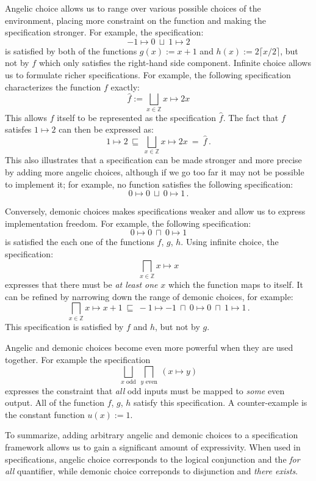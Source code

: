 \documentclass[11pt,oneside,draft]{book}
\theoremstyle{definition}
\newcommand{\refby}{\sqsubseteq} %
\begin{document}
Angelic choice allows us to range over
various possible choices of the environment,
placing more constraint on the function and
making the specification stronger.
For example,
the specification:
\[
    -1 \mapsto 0
    \: \sqcup \:
    1 \mapsto 2
\]
is satisfied by both of the functions
$g(x) := x + 1$ and $h(x) := 2 \lceil x / 2 \rceil$,
but not by $f$ which only satisfies the right-hand side component.
Infinite choice allows us to formulate
richer specifications.
For example, the following specification
characterizes the function $f$ exactly:
\[
  \hat{f} := \bigsqcup_{x \in \mathbb{Z}} x \mapsto 2x
\]
This allows $f$ itself to be represented as the specification $\hat{f}$.
The fact that $f$ satisfes $1 \mapsto 2$ can then be expressed as:
\[
  1 \mapsto 2
  \: \sqsubseteq \:
  \bigsqcup_{x \in \mathbb{Z}} x \mapsto 2x
  \: = \:
  \hat{f}
  \,.
\]
This also illustrates that
a specification can be made stronger
and more precise by adding more angelic choices,
although if we go too far it may not be possible to implement it;
for example, no function satisfies
the following specification:
\[
  0 \mapsto 0 \: \sqcup \: 0 \mapsto 1
  \,.
\]

Conversely,
demonic choices
makes specifications weaker and
allow us to express implementation freedom.
For example, the following specification:
\[
    0 \mapsto 0 \: \sqcap \: 0 \mapsto 1
\]
is satisfied the each one of the functions $f$, $g$, $h$.
Using infinite choice,
the specification:
\[
    \bigsqcap_{x \in \mathbb{Z}} x \mapsto x
\]
expresses that there must be \emph{at least one} $x$
which the function maps to itself.
It can be refined by narrowing down the range
of demonic choices, for example:
\[
  \bigsqcap_{x \in \mathbb{Z}} x \mapsto x + 1
  \: \refby \:
  -1 \mapsto -1
  \: \sqcap \:
  0 \mapsto 0
  \: \sqcap \:
  1 \mapsto 1
  \,.
\]
This specification is satisfied by $f$ and $h$,
but not by $g$.

Angelic and demonic choices become even more powerful
when they are used together.
For example the specification
\[
  \bigsqcup_{x \text{ odd}} \:
  \bigsqcap_{y \text{ even}} \:
  (x \mapsto y)
\]
expresses the constraint that \emph{all} odd inputs 
must be mapped to \emph{some} even output.
All of the function $f$, $g$, $h$ satisfy this specification.
A counter-example is the constant function $u(x) := 1$.

To summarize,
adding arbitrary angelic and demonic choices
to a specification framework
allows us to gain a significant amount of expressivity.
When used in specifications,
angelic choice corresponds to
the logical conjunction and the \emph{for all} quantifier,
while demonic choice correponds to
disjunction and \emph{there exists}.
\end{document}
